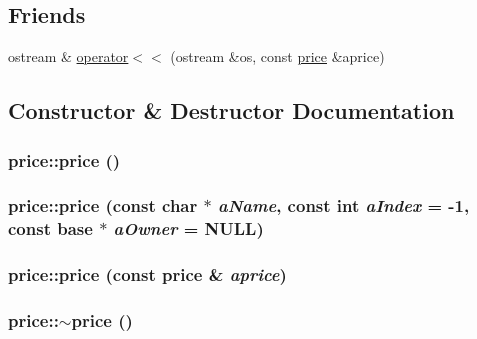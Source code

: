 \subsection*{Friends}
\begin{DoxyCompactItemize}
\item 
ostream \& \hyperlink{classprice_ac7c80f9b2cbaaff0824af0e37f65ce86}{operator$<$$<$} (ostream \&os, const \hyperlink{classprice}{price} \&aprice)
\end{DoxyCompactItemize}


\subsection{Constructor \& Destructor Documentation}
\hypertarget{classprice_ad7e902e9521e51b2988740890e8fcf2d}{
\subsubsection[{price}]{\setlength{\rightskip}{0pt plus 5cm}price::price ()}}
\label{classprice_ad7e902e9521e51b2988740890e8fcf2d}
\hypertarget{classprice_ab8fd5e10683db852f47f63e280fbaec2}{
\subsubsection[{price}]{\setlength{\rightskip}{0pt plus 5cm}price::price (const char $\ast$ {\em aName}, \/  const int {\em aIndex} = {\ttfamily -\/1}, \/  const {\bf base} $\ast$ {\em aOwner} = {\ttfamily NULL})}}
\label{classprice_ab8fd5e10683db852f47f63e280fbaec2}
\hypertarget{classprice_a91c82c0d64e08f44f6a2d8944a8b5ece}{
\subsubsection[{price}]{\setlength{\rightskip}{0pt plus 5cm}price::price (const {\bf price} \& {\em aprice})}}
\label{classprice_a91c82c0d64e08f44f6a2d8944a8b5ece}
\hypertarget{classprice_a235c7d258bc22c052fc07e7c63a59c20}{
\subsubsection[{$\sim$price}]{\setlength{\rightskip}{0pt plus 5cm}price::$\sim$price ()}}
\label{classprice_a235c7d258bc22c052fc07e7c63a59c20}


